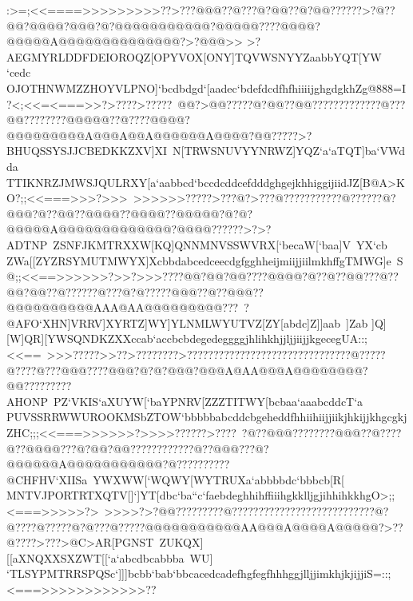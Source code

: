 {{{ :>=;<<====>>>>>>>>>??>???@@@??@???@?@@??@?@@??????>?@??@@?@@@@?@@@?@?@@@@@@@@@@@?@@@@@????@@@@?@@@@@A@@@@@@@@@@@@@@?>?@@@>>%
 >?AEGMYRLDDFDEIOROQZ[OPYVOX[ONY]TQVWSNYYZaabbYQT[YW%
 `cedc}
 \hbox{OJOTHNWMZZHOYVLPNO]`bcdbdgd`[aadec`bdefdcdfhfhiiiijghgdgkhZg@888=I?<;<<=<===>>?>????>?????%
 @@?>@@?????@?@@??@@?????????????@???@@????????@@@@@??@????@@@@?@@@@@@@@@A@@@A@@A@@@@@@A@@@@?@@?????>?BHUQSSYSJJCBEDKKZXV]XI%
 N[TRWSNUVYYNRWZ]YQZ`a`aTQT]ba`VWdda}
 \hbox{TTIKNRZJMWSJQULRXY[a`aabbcd`bccdcddcefdddghgejkhhiggijiidJZ[B@A>KO?;;<<===>>>?>>>%
 >>>>>>?????>???@?>???@???????????@??????@?@@@?@??@@??@@@@??@@@@??@@@@@?@?@?@@@@@A@@@@@@@@@@@@@?@@@@??????>?>?ADTNP%
 ZSNFJKMTRXXW[KQ]QNNMNVSSWVRX[`becaW[`baa]V%
 YX`cb}
 \hbox{ZWa[[ZYZRSYMUTMWYX]XcbbdabcedceecdgfgghheijmiijjiilmkhffgTMWG]e%
 S@;;<<==>>>>>>?>>?>>>????@@?@@?@@????@@@@?@??@??@@???@??@@?@@??@??????@???@?@?????@@@??@??@@@??@@@@@@@@@@AAA@AA@@@@@@@@@???%
 ?@AFO`XHN]VRRV]XYRTZ]WY]YLNMLWYUTVZ[ZY[abdc]Z]]aab%
 ]Zab}
 \hbox{]Q][W]QR][YWSQNDKZXXccab`accbcbdegedeggggjhlihkhjjljjiijjkgecegUA::;<<==%
 >>>?????>>??>????????>???????????????????????????????@?????@????@???@@@????@@@?@?@?@@@?@@@A@AA@@@A@@@@@@@@?@@?????????AHONP%
 PZ`VKIS`aXUYW[`baYPNRV[ZZZTITWY[bcbaa`aaabcddcT`a}
 \hbox{PUVSSRRWWUROOKMSbZTOW`bbbbbabcddcbgeheddfhhiihiijjiikjhkijjkhgcgkjZHC;;;<<===>>>>>>?>>>>??????>????%
 ?@??@@@????????@@@??@????@??@@@@???@?@@?@@????????????@??@@@???@?@@@@@@A@@@@@@@@@@@?@??????????@CHFHV`XIISa%
 YWXWW[`WQWY[WYTRUXa`abbbbdc`bbbcb[R[%
 }
 \hbox{MNTVJPORTRTXQTV[]`]YT[dbc`ba``c`faebdeghhihffiiihgkklljgjihhihkkhgO>;;<===>>>>>?>%
 >>>>?>?@@?????????@???????????????????????????@?@????@?????@?@???@?????@@@@@@@@@@@AA@@@A@@@@A@@@@@?>??@????>???>@C>AR[PGNST%
 ZUKQX][[aXNQXXSXZWT[[`a`abcdbcabbba%
 WU]}
 \hbox{`TLSYPMTRRSPQSc`]]]bcbb`bab`bbcacedcadefhgfegfhhhggjlljjimkhjkjijjiS=::;<===>>>>>>>>>>>>??%
}}}

